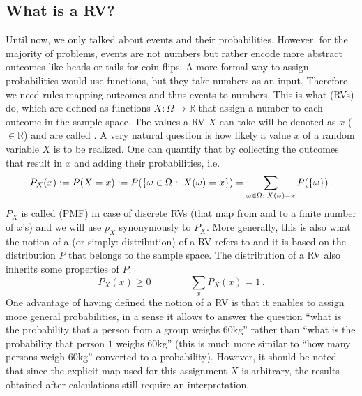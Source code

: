 	\subsection{What is a RV?}
Until now, we only talked about events and their probabilities. However, for the majority of problems, events are not numbers but rather encode more abstract outcomes like heads or tails for coin flips. %
A more formal way to assign probabilities would use functions, but they take numbers as an input. Therefore, we need rules mapping outcomes and thus events to numbers.
This is what  (RVs) do, which are defined as functions $X: \Omega \rightarrow \mathbb{R}$ that assign a number to each outcome in the sample space. The values a RV $X$ can take will be denoted as $x$ ($\in \mathbb{R}$) and are called . A very natural question is how likely a value $x$ of a random variable $X$ is to be realized. One can quantify that by collecting the outcomes that result in $x$ and adding their probabilities, i.e.
\begin{equation}\label{eq:RV_distr}
P_X(x) := P(X = x) := P(\qty{\omega \in \Omega: \; X(\omega) = x}) = \sum_{\omega \in \Omega: \; X(\omega) = x} P(\qty{\omega}) \, .
\end{equation}
$P_X$ is called  (PMF) in case of discrete RVs (that map from and to a finite number of $x$'s) and we will use $p_X$ synonymously to $P_X$. More generally, this is also what the notion of a  (or simply: distribution) of a RV refers to and it is based on the distribution $P$ that belongs to the sample space. The distribution of a RV also inherits some properties of $P$:
\begin{equation}
P_X(x) \geq 0 \qquad \qquad \sum_x P_X(x) = 1 \, .
\end{equation}
One advantage of having defined the notion of a RV is that it enables to assign more general probabilities, in a sense it allows to answer the question \enquote{what is the probability that a person from a group weighs $60$kg} rather than \enquote{what is the probability that person $1$ weighs $60$kg} (this is much more similar to \enquote{how many persons weigh $60$kg} converted to a probability). However, it should be noted that since the explicit map used for this assignment $X$ is arbitrary, the results obtained after calculations still require an interpretation.


